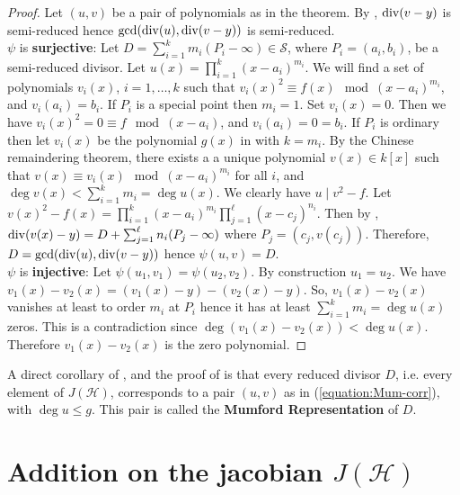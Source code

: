 \begin{proof}
Let $(u, v)$ be a pair of polynomials as in the theorem. By 
, $\operatorname{div}(v - y)$ is semi-reduced hence $\gcd(\operatorname{div}(u), 
\operatorname{div}(v - y))$ is semi-reduced. \\
$\psi$ is \textbf{surjective}: Let $D = \sum_{i = 1}^km_i(P_i - \infty) \in \mathcal{S}$, where $P_i 
= (a_i, b_i)$, be a semi-reduced divisor. Let $u(x) = \prod_{i = 1}^k(x - a_i)^{m_i}$. We will find 
a set of polynomials $v_i(x)$, $i = 1, \dots, k$ such that $v_i(x)^2 \equiv f(x) \mod (x - 
a_i)^{m_i}$, and $v_i(a_i) = b_i$. If $P_i$ is a special point then $m_i = 1$. Set $v_i(x) = 0$. 
Then we have $v_i(x)^2 = 0 \equiv f \mod (x - a_i)$, and $v_i(a_i) = 0 = b_i$. If $P_i$ is ordinary 
then let $v_i(x)$ be the polynomial $g(x)$ in  with $k = m_i$. By 
the Chinese remaindering theorem, there exists a a unique polynomial $v(x) \in k[x]$ such that $v(x) 
\equiv v_i(x) \mod (x - a_i)^{m_i}$ for all $i$, and $\deg v(x) < \sum_{i = 1}^k m_i = \deg u(x)$. 
We clearly have $u \mid v^2 - f$. Let $v(x)^2 - f(x) = \prod_{i = 1}^k(x - a_i)^{m_i}\prod_{j = 
1}^\ell (x - c_j)^{n_i}$. Then by , $\operatorname{div}(v(x) - y) = D 
+ \sum_{j = 1}^\ell n_i(P_j - \infty)$ where $P_j = (c_j, v(c_j))$. Therefore, $D = 
\gcd(\operatorname{div}(u), \operatorname{div}(v - y))$ hence $\psi(u, v) = D$. \\
$\psi$ is \textbf{injective}: Let $\psi(u_1, v_1) = \psi(u_2, v_2)$. By construction $u_1 = u_2$. We 
have $v_1(x) - v_2(x) = (v_1(x) - y) - (v_2(x) - y)$. So, $v_1(x) - v_2(x)$ vanishes at least to 
order $m_i$ at $P_i$ hence it has at least $\sum_{i = 1}^k m_i = \deg u(x)$ zeros. This is a 
contradiction since $\deg(v_1(x) - v_2(x)) < \deg u(x)$. Therefore $v_1(x) - v_2(x)$ is the zero 
polynomial.
\end{proof}
A direct corollary of , and the proof of 
 is that every reduced divisor $D$, i.e. every element of 
$J(\mathcal{H})$, corresponds to a pair $(u, v)$ as in (\ref{equation:Mum-corr}), with $\deg u \le 
g$. This pair is called the \textbf{Mumford Representation} of $D$.









\section{Addition on the jacobian $J(\mathcal{H})$}
\label{section:add-jac}

